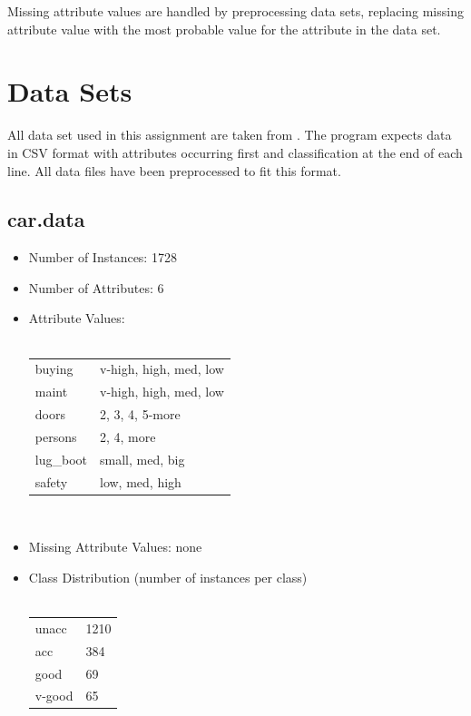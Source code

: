 \documentclass[10pt]{report}
\begin{document}
Missing attribute values are handled by preprocessing data sets,
replacing missing attribute value with the most probable value for the
attribute in the data set.


\section{Data Sets}
All data set used in this assignment are taken from
\cite{Frank+Asuncion:2010}. The program expects data in CSV format
with attributes occurring first and classification at the end of each
line. All data files have been preprocessed to fit this format.

\subsection*{car.data}
\begin{itemize}
\item Number of Instances: 1728
\item Number of Attributes: 6
\item Attribute Values:
  \\\\
  \begin{left}
    \begin{tabular}{ l l }
      buying     & v-high, high, med, low \\
      maint      & v-high, high, med, low \\
      doors      & 2, 3, 4, 5-more \\
      persons    & 2, 4, more \\
      lug\_boot  & small, med, big \\
      safety     & low, med, high \\
    \end{tabular}
  \end{left}
  \\
\item Missing Attribute Values: none
\item Class Distribution (number of instances per class)
  \\\\
  \begin{left}
    \begin{tabular}{ l l }
      unacc   &  1210 \\
      acc     &   384 \\   
      good    &    69 \\     
      v-good  &    65 \\
    \end{tabular}
  \end{left}
\end{itemize}
\end{document}
